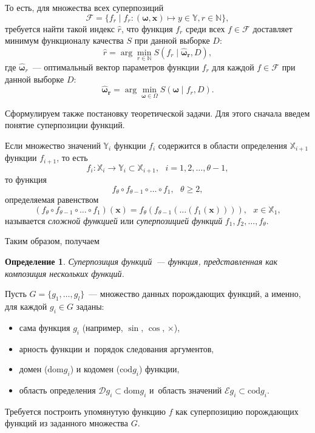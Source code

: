 \documentclass[12pt,a4paper]{article}
\newtheorem{defin}{Определение}
\begin{document}
То есть, для множества всех суперпозиций
\[
\mathcal{F} = \{ f_r \mid
			f_r : (\boldsymbol{\omega}, \mathbf{x}) \mapsto y \in \mathbb{Y},
			r \in \mathbb{N} \},
\]
требуется найти такой индекс $\hat{r}$, что функция $f_r$ среди всех
$f \in \mathcal{F}$ доставляет минимум функционалу качества $S$ при данной
выборке $D$:
\begin{equation}
  \label{eq:hat_r}
  \hat{r} = \arg \min_{r \in \mathbb{N}} S (f_r \mid \boldsymbol{\hat{\omega}_r}, D),
\end{equation}
где $\boldsymbol{\hat{\omega}}_r$~--- оптимальный вектор параметров функции
$f_r$ для каждой $f \in \mathcal{F}$ при данной выборке $D$:
\begin{equation}
  \label{eq:hat_omega}
  \boldsymbol{\hat{\omega}_r} = \arg \min_{\boldsymbol{\omega} \in \Omega} S(\boldsymbol{\omega} \mid f_r, D).
\end{equation}

Сформулируем также постановку теоретической задачи. Для этого сначала
введем понятие суперпозиции функций.

Если множество значений $\mathbb{Y}_i$ функции $f_i$ содержится в области
определения $\mathbb{X}_{i+1}$ функции $f_{i+1}$, то есть
\[
f_i : \mathbb{X}_i \to \mathbb{Y}_i \subset \mathbb{X}_{i+1}, ~~~ i = 1, 2, \dots, \theta - 1,
\]
то функция
\[
f_\theta \circ f_{\theta-1} \circ \dots \circ f_1, ~~~ \theta \geq 2,
\]
определяемая равенством
\[
(f_\theta \circ f_{\theta-1} \circ \dots \circ f_1) (\mathbf{x}) =
  f_{\theta} (f_{\theta-1} (\dots (f_1 (\mathbf{x})))), ~~~ x \in \mathbb{X}_1,
\]
называется \emph{сложной функцией} \cite{MathEnc1984_4} или
\emph{суперпозицией функций} $f_1, f_2, \dots, f_\theta$.

Таким образом, получаем
\begin{defin}
  Суперпозиция функций~--- функция, представленная как композиция нескольких
  функций. 
\end{defin}

Пусть $G = \{ g_1, \dots, g_l \}$~--- множество данных порождающих
функций, а именно, для каждой $g_i \in G$ заданы:
\begin{itemize}
  \item сама функция $g_i$ (например, $\sin$, $\cos$, $\times$),
  \item арность функции и~порядок следования аргументов,
  \item домен ($\text{dom} g_i$) и кодомен ($\text{cod} g_i$) функции,
  \item область определения $\mathcal{D} g_i \subset \text{dom} g_i$ и~область
	значений $\mathcal{E} g_i \subset \text{cod} g_i$.
\end{itemize}
Требуется построить упомянутую функцию $f$ как суперпозицию порождающих
функций из заданного множества $G$.
\end{document}
